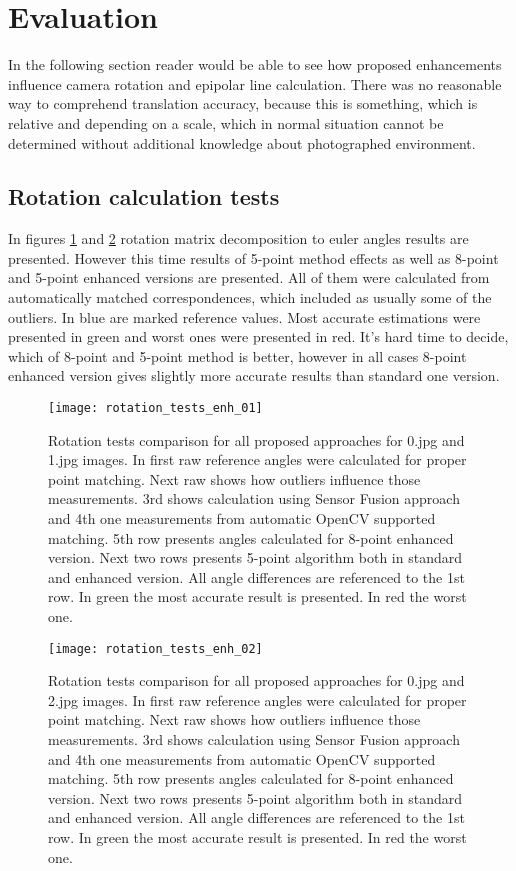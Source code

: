 \section{Evaluation}
In the following section reader would be able to see how proposed enhancements influence camera rotation and epipolar line calculation. There was no reasonable way to comprehend translation accuracy, because this is something, which is relative and depending on a scale, which in normal situation cannot be determined without additional knowledge about photographed environment.
\subsection{Rotation calculation tests}
In figures \ref{fig:rotation_tests_enh_01} and \ref{fig:rotation_tests_enh_02} rotation matrix decomposition to euler angles results are presented. However this time results of 5-point method effects as well as 8-point and 5-point enhanced versions are presented. All of them were calculated from automatically matched correspondences, which included as usually some of the outliers. In blue are marked reference values. Most accurate estimations were presented in green and worst ones were presented in red. It's hard time to decide, which of 8-point and 5-point method is better, however in all cases 8-point enhanced version gives slightly more accurate results than standard one version.
\begin{figure}[h!]
    \centering
    \texttt{[image: rotation\_tests\_enh\_01]}
    \caption[Rotation tests comparison for all proposed approaches - 1st example]{Rotation tests comparison for all proposed approaches for 0.jpg and 1.jpg images. In first raw reference angles were calculated for proper point matching. Next raw shows how outliers influence those measurements. 3rd shows calculation using Sensor Fusion approach and 4th one measurements from automatic OpenCV supported matching. 5th row presents angles calculated for 8-point enhanced version. Next two rows presents 5-point algorithm both in standard and enhanced version. All angle differences are referenced to the 1st row. In green the most accurate result is presented. In red the worst one.}
    \label{fig:rotation_tests_enh_01}
\end{figure}

\begin{figure}[h!]
    \centering
    \texttt{[image: rotation\_tests\_enh\_02]}
    \caption[Rotation tests comparison for all proposed approaches - 2nd example]{Rotation tests comparison for all proposed approaches for 0.jpg and 2.jpg images. In first raw reference angles were calculated for proper point matching. Next raw shows how outliers influence those measurements. 3rd shows calculation using Sensor Fusion approach and 4th one measurements from automatic OpenCV supported matching. 5th row presents angles calculated for 8-point enhanced version. Next two rows presents 5-point algorithm both in standard and enhanced version. All angle differences are referenced to the 1st row. In green the most accurate result is presented. In red the worst one.}
    \label{fig:rotation_tests_enh_02}
\end{figure}

